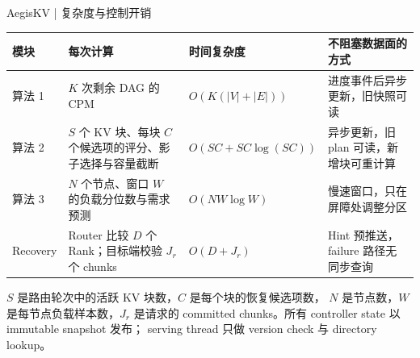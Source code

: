 \begin{frame}{AegisKV | 复杂度与控制开销}
  \scriptsize
  \renewcommand{\arraystretch}{1.16}
  \begin{tabularx}{\textwidth}{p{}p{}p{}X}
    \toprule
    模块 & 每次计算 & 时间复杂度 & 不阻塞数据面的方式 \\
    \midrule
    算法 1
      & $K$ 次剩余 DAG 的 CPM
      & $O(K(|V|+|E|))$
      & 进度事件后异步更新，旧快照可读 \\
    算法 2
      & $S$ 个 KV 块、每块 $C$ 个候选项的评分、影子选择与容量截断
      & $O(SC+SC\log(SC))$
      & 异步更新，旧 plan 可读，新增块可重计算 \\
    算法 3
      & $N$ 个节点、窗口 $W$ 的负载分位数与需求预测
      & $O(NW\log W)$
      & 慢速窗口，只在屏障处调整分区 \\
    Recovery
      & Router 比较 $D$ 个 Rank；目标端校验 $J_r$ 个 chunks
      & $O(D+J_r)$
      & Hint 预推送，failure 路径无同步查询 \\
    \bottomrule
  \end{tabularx}

  \vspace{0.12cm}
  \scriptsize
  $S$ 是路由轮次中的活跃 KV 块数，$C$ 是每个块的恢复候选项数，
  $N$ 是节点数，$W$ 是每节点负载样本数，$J_r$ 是请求的
  committed chunks。所有 controller state 以 immutable snapshot 发布；
  serving thread 只做 version check 与 directory lookup。

\end{frame}

